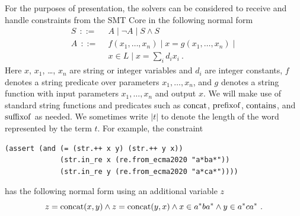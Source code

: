 For the purposes of presentation, the solvers can be considered to receive and handle constraints from the SMT Core in the following normal form
\begin{align*}
    S ~~::=~~ & A \;|\; \neg A \;|\; S \land S \\
    A ~~::=~~ &
        f(x_1, \ldots, x_n)
        \;|\; x = g(x_1, \ldots, x_n)
        \;|\; \\ & x \in L
        \;|\; x = \sum_i d_i x_i \ .
\end{align*}
Here $x$, $x_1$, \ldots, $x_n$ are string or integer variables and $d_i$ are integer constants, $f$ denotes a string predicate over parameters $x_1, \ldots, x_n$, and $g$ denotes a string function with input parameters $x_1, \ldots, x_n$ and output $x$.
We will make use of standard string functions and predicates such as $\operatorname{concat}$, $\operatorname{prefixof}$, $\operatorname{contains}$, and $\operatorname{suffixof}$ as needed.
We sometimes write $|t|$ to denote the length of the word represented by the term $t$.
For example, the constraint
\begin{lstlisting}[language=SMTLib,frame=single]
(assert (and (= (str.++ x y) (str.++ y x))
             (str.in_re x (re.from_ecma2020 "a*ba*"))
             (str.in_re y (re.from_ecma2020 "a*ca*"))))
\end{lstlisting}
has the following normal form using an additional variable $z$
\[
    z = \operatorname{concat}(x,y) \wedge z = \operatorname{concat}(y,x)
        \wedge x \in a^*ba^* \wedge y \in a^*ca^* \ .
\]


